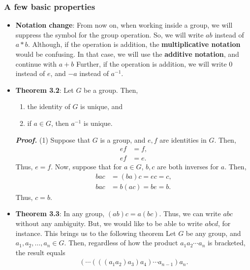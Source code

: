 \documentclass{report}
\begin{document}
    \pagebreak 
    \subsubsection{A few basic properties}
    \begin{itemize}
        \item \textbf{Notation change}: From now on, when working inside a group, we will suppress the symbol for the group operation. So, we will write $ab$ instead of $a\ast b$. Although, if the operation is addition, the \textbf{multiplicative notation} would be confusing. In that case, we will use the \textbf{additive notation}, and continue with $a + b$
            \bigbreak \noindent 
            Further, if the operation is addition, we will write $0$ instead of $e$, and $-a$ instead of $a^{-1}$.
        \item \textbf{Theorem 3.2}: Let $G$ be a group. Then, 
            \begin{enumerate}
                \item the identity of $G$ is unique, and
                \item if $a\in G$, then $a^{-1}$ is unique.
            \end{enumerate}
            \textbf{\textit{Proof.}} (1) Suppose that $G$ is a group, and $e,f$ are identities in $G$. Then,
            \begin{align*}
                ef &= f, \\
                ef &= e
            .\end{align*}
            Thus, $e = f$. Now, suppose that for $a \in G$, $b,c$ are both inverses for $a$. Then,
            \begin{align*}
                bac &= (ba)c = ec = c, \\
                bac &= b(ac) = be = b
            .\end{align*}
            Thus, $c = b$.
        \item \textbf{Theorem 3.3}: In any group, $(ab)c = a(bc)$. Thus, we can write $abc$ without any ambiguity. But, we would like to be able to write $abcd$, for instance. This brings us to the following theorem
            \bigbreak \noindent 
            Let $G$ be any group, and $a_{1}, a_{2}, \dots, a_{n} \in G$. Then, regardless of how the product $a_{1}a_{2}\cdots a_{n}$ is bracketed, the result equals 
            \begin{align*}
                (\cdots(((a_{1}a_{2})a_{3})a_{4})\cdots a_{n-1})a_{n}
            .\end{align*}

\end{itemize}
\end{document}
